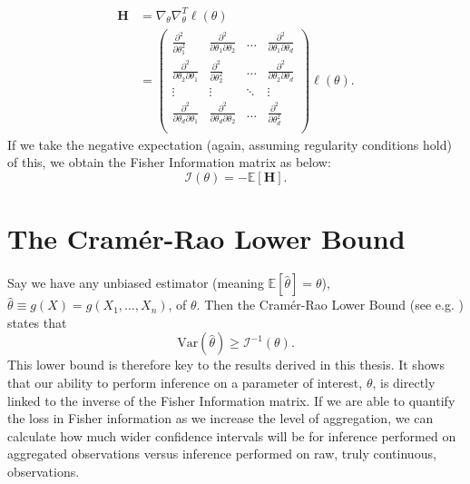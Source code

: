 \documentclass[11pt,a4,twosided,singlespacing,titlepagenumber=on,numbers=endperiod]{scrreprt}
\numberwithin{equation}{chapter} %
\theoremstyle{remark}
\begin{document}
\begin{equation}
	\begin{aligned}
	\mathbf{H} &= \nabla_\theta \nabla_\theta^T \ell(\theta) \\
	&= \begin{pmatrix}
		\frac{\partial^2}{\partial \theta_1^2} & \frac{\partial^2}{\partial \theta_1 \partial \theta_2} & \dots & \frac{\partial^2}{\partial \theta_1 \partial \theta_d}\\
		\frac{\partial^2}{\partial \theta_2 \partial \theta_1} & \frac{\partial^2}{\partial \theta_2^2} & \dots & \frac{\partial^2}{\partial \theta_2 \partial \theta_d}\\
		\vdots & \vdots & \ddots & \vdots\\
		\frac{\partial^2}{\partial \theta_d \partial \theta_1} & \frac{\partial^2}{\partial \theta_d \partial \theta_2} & \dots & \frac{\partial^2}{\partial \theta_d^2}\\
	\end{pmatrix}\ell(\theta).
	\end{aligned}
\end{equation}
If we take the negative expectation (again, assuming regularity conditions hold) of this, we obtain the Fisher Information matrix as below:
\begin{equation}\label{eq:fisher}
	\mathcal{I}(\theta) = -\mathbb{E}\left[ \mathbf{H} \right].
\end{equation}

\section{The Cram\'er-Rao Lower Bound}\label{sec:crlb}
Say we have any unbiased estimator (meaning $\mathbb{E}[\hat{\theta}] = \theta$), $\hat{\theta} \equiv g(X) = g(X_1, \dots, X_n)$, of $\theta$. Then the Cram\'er-Rao Lower Bound (see e.g. \cite{rao_crlb}) states that
\begin{equation}\label{eq:crlb_unbiased}
	\text{Var}(\hat{\theta}) \geq \mathcal{I}^{-1}(\theta).
\end{equation}
This lower bound is therefore key to the results derived in this thesis. It shows that our ability to perform inference on a parameter of interest, $\theta$, is directly linked to the inverse of the Fisher Information matrix.
If we are able to quantify the loss in Fisher information as we increase the level of aggregation, we can calculate how much wider confidence intervals will be for inference performed on aggregated observations versus inference performed on raw, truly continuous, observations.
\end{document}
